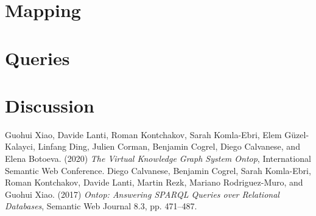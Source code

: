 \documentclass{article}
\begin{document}
\section{Mapping}


\section{Queries}


\section{Discussion}



\begin{thebibliography}{99}
Guohui Xiao, Davide Lanti, Roman Kontchakov, Sarah Komla-Ebri, Elem Güzel-Kalayci, Linfang Ding, Julien Corman, Benjamin Cogrel, Diego Calvanese, and Elena Botoeva. (2020) \emph{The Virtual Knowledge Graph System Ontop}, International Semantic Web Conference.
Diego Calvanese, Benjamin Cogrel, Sarah Komla-Ebri, Roman Kontchakov, Davide Lanti, Martin Rezk, Mariano Rodriguez-Muro, and Guohui Xiao. (2017) \emph{Ontop: Answering SPARQL Queries over Relational Databases}, Semantic Web Journal 8.3, pp. 471–487.
\end{thebibliography}
\end{document}
